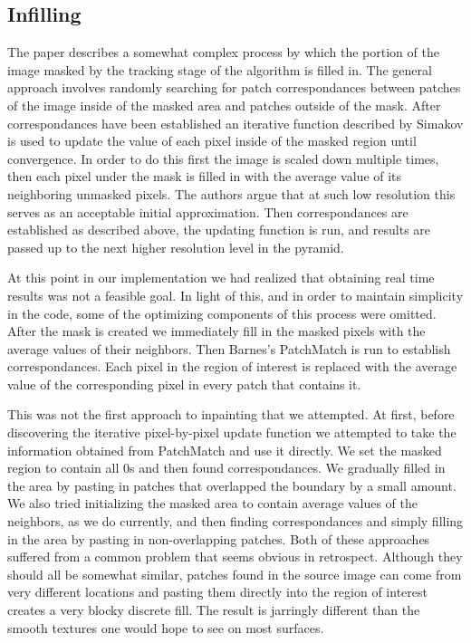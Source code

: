 \documentclass[12pt]{article}
\begin{document}
\subsection{Infilling}
The paper describes a somewhat complex process by which the portion of the image masked by the tracking stage of the algorithm is filled in. The general approach involves randomly searching for patch correspondances between patches of the image inside of the masked area and patches outside of the mask. After correspondances have been established an iterative function described by Simakov is used to update the value of each pixel inside of the masked region until convergence. In order to do this first the image is scaled down multiple times, then each pixel under the mask is filled in with the average value of its neighboring unmasked pixels. The authors argue that at such low resolution this serves as an acceptable initial approximation. Then correspondances are established as described above, the updating function is run, and results are passed up to the next higher resolution level in the pyramid. 

At this point in our implementation we had realized that obtaining real time results was not a feasible goal. In light of this, and in order to maintain simplicity in the code, some of the optimizing components of this process were omitted. After the mask is created we immediately fill in the masked pixels with the average values of their neighbors. Then Barnes's PatchMatch is run to establish correspondances. Each pixel in the region of interest is replaced with the average value of the corresponding pixel in every patch that contains it. 

This was not the first approach to inpainting that we attempted. At first, before discovering the iterative pixel-by-pixel update function we attempted to take the information obtained from PatchMatch and use it directly. We set the masked region to contain all 0s and then found correspondances. We gradually filled in the area by pasting in patches that overlapped the boundary by a small amount. We also tried initializing the masked area to contain average values of the neighbors, as we do currently, and then finding correspondances and simply filling in the area by pasting in non-overlapping patches. Both of these approaches suffered from a common problem that seems obvious in retrospect. Although they should all be somewhat similar, patches found in the source image can come from very different locations and pasting them directly into the region of interest creates a very blocky discrete fill. The result is jarringly different than the smooth textures one would hope to see on most surfaces. 
\end{document}
